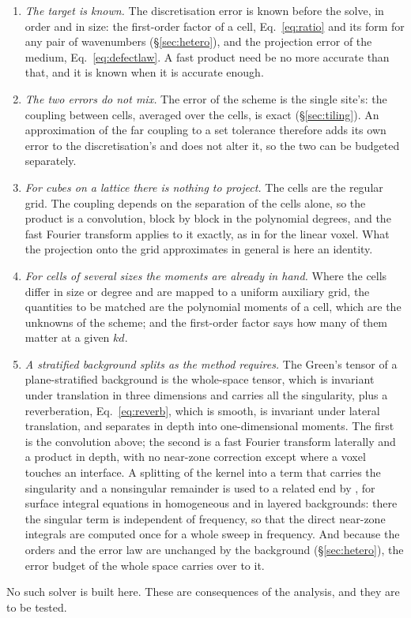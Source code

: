 \documentclass[preprint,review,12pt]{elsarticle}
\begin{document}
\begin{enumerate}
\item \emph{The target is known.} The discretisation error is known before the solve, in order and in
size: the first-order factor of a cell, Eq.~\eqref{eq:ratio} and its form for any pair of wavenumbers
(\S\ref{sec:hetero}), and the projection error of the medium, Eq.~\eqref{eq:defectlaw}. A fast product
need be no more accurate than that, and it is known when it is accurate enough.
\item \emph{The two errors do not mix.} The error of the scheme is the single site's: the coupling
between cells, averaged over the cells, is exact (\S\ref{sec:tiling}). An approximation of the far
coupling to a set tolerance therefore adds its own error to the discretisation's and does not alter
it, so the two can be budgeted separately.
\item \emph{For cubes on a lattice there is nothing to project.} The cells are the regular grid. The
coupling depends on the separation of the cells alone, so the product is a convolution, block by block
in the polynomial degrees, and the fast Fourier transform applies to it exactly, as in
\citet{Georgakis2020} for the linear voxel. What the projection onto the grid approximates in general is here an identity.
\item \emph{For cells of several sizes the moments are already in hand.} Where the cells differ in
size or degree and are mapped to a uniform auxiliary grid, the quantities to be matched are the
polynomial moments of a cell, which are the unknowns of the scheme; and the first-order factor says
how many of them matter at a given $kd$.
\item \emph{A stratified background splits as the method requires.} The Green's tensor of a
plane-stratified background is the whole-space tensor, which is invariant under translation in three
dimensions and carries all the singularity, plus a reverberation, Eq.~\eqref{eq:reverb}, which is
smooth, is invariant under lateral translation, and separates in depth into one-dimensional moments.
The first is the convolution above; the second is a fast Fourier transform laterally and a product in
depth, with no near-zone correction except where a voxel touches an interface. A splitting of the kernel into a term that carries the singularity and a nonsingular
remainder is used to a related end by \citet{Sharma2021}, for surface integral equations in homogeneous
and in layered backgrounds: there the singular term is independent of frequency, so that the direct
near-zone integrals are computed once for a whole sweep in frequency. And because the orders and the error law are unchanged by the background
(\S\ref{sec:hetero}), the error budget of the whole space carries over to it.
\end{enumerate}
No such solver is built here. These are consequences of the analysis, and they are to be tested.
\end{document}
